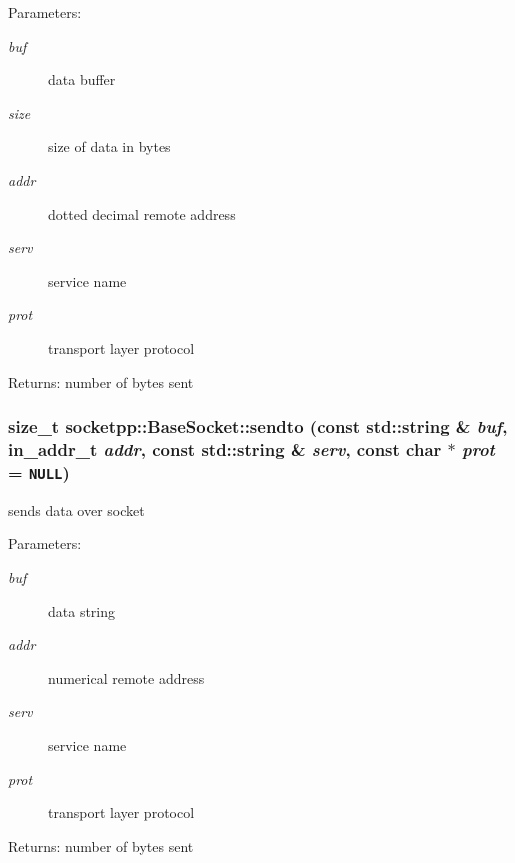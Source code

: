\begin{CompactItemize}
\begin{Desc}
\item[Parameters:]
\begin{description}
\item[{\em buf}]data buffer \item[{\em size}]size of data in bytes \item[{\em addr}]dotted decimal remote address \item[{\em serv}]service name \item[{\em prot}]transport layer protocol \end{description}
\end{Desc}
\begin{Desc}
\item[Returns:]number of bytes sent \end{Desc}
\hypertarget{classsocketpp_1_1BaseSocket_4afc9ac34b702af852f2b52e68a90c3e}{
\subsubsection[{sendto}]{\setlength{\rightskip}{0pt plus 5cm}size\_\-t socketpp::BaseSocket::sendto (const std::string \& {\em buf}, \/  in\_\-addr\_\-t {\em addr}, \/  const std::string \& {\em serv}, \/  const char $\ast$ {\em prot} = {\tt NULL})}}
\label{classsocketpp_1_1BaseSocket_4afc9ac34b702af852f2b52e68a90c3e}


sends data over socket 

\begin{Desc}
\item[Parameters:]
\begin{description}
\item[{\em buf}]data string \item[{\em addr}]numerical remote address \item[{\em serv}]service name \item[{\em prot}]transport layer protocol \end{description}
\end{Desc}
\begin{Desc}
\item[Returns:]number of bytes sent \end{Desc}
\hypertarget{classsocketpp_1_1BaseSocket_0154d562be27c8b2aa074d5f6bb8ab03}{
}
\end{CompactItemize}

